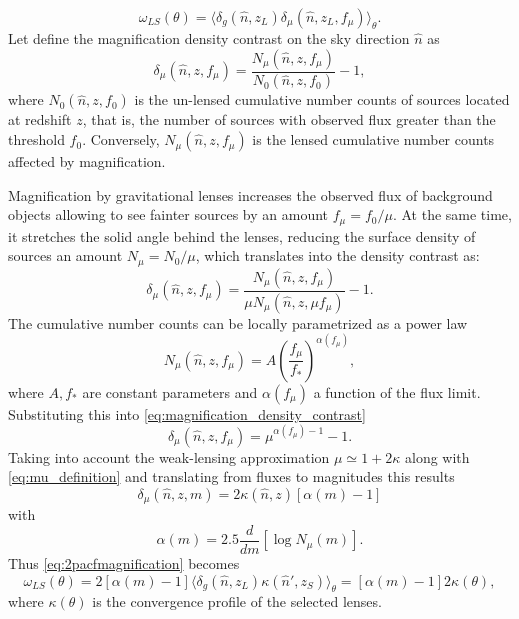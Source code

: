 \begin{equation}
\omega_{LS}(\theta) = \langle\delta_g(\hat n,z_L)\delta_\mu(\hat n,z_L,f_\mu)\rangle_\theta.
\end{equation}
Let define the magnification density contrast on the sky direction $\hat n$ as 
\begin{equation}
\delta_\mu(\hat n,z,f_\mu) = \frac{N_\mu(\hat n,z,f_\mu)}{N_0(\hat n,z,f_0)}-1,
\end{equation}
where $N_0(\hat n,z,f_0)$ is the un-lensed cumulative number counts of sources located at redshift $z$, that is, the number of sources with observed flux greater than the threshold $f_0$. Conversely, $N_\mu(\hat n,z,f_\mu)$ is the lensed cumulative number counts affected by magnification.
\newline

Magnification by gravitational lenses increases the observed flux of background objects  allowing to see fainter sources by an amount $f_\mu = f_0/\mu$. At the same time, it stretches the solid angle behind the lenses, reducing the surface density of sources an amount $N_\mu = N_0/\mu$, which translates into the density contrast as:
\begin{equation}
\delta_\mu(\hat n,z,f_\mu) = \frac{N_\mu(\hat n,z,f_\mu)}{\mu N_\mu(\hat n,z,\mu f_\mu)}-1.
\label{eq:magnification_density_contrast}
\end{equation}
The cumulative number counts can be locally parametrized as a power law
\begin{equation}
N_\mu(\hat n,z,f_\mu) = A\left(\frac{f_\mu}{f_*}\right)^{\alpha(f_\mu)},
\end{equation}
where $A,f_*$ are constant parameters and $\alpha(f_\mu)$ a function of the flux limit. Substituting this into \autoref{eq:magnification_density_contrast}
\begin{equation}
\delta_\mu(\hat n,z,f_\mu) = \mu^{\alpha(f_\mu)-1}-1.
\end{equation}
Taking into account the weak-lensing approximation $\mu\simeq 1+2\kappa$ along with \autoref{eq:mu_definition} and translating from fluxes to magnitudes this results
\begin{equation}
\delta_\mu(\hat n,z,m) = 2\kappa(\hat n,z)[\alpha(m)-1]
\end{equation}
with
\begin{equation}
\alpha(m) = 2.5\frac{d}{dm}\left[\log N_\mu(m)\right].
\label{eq:alpha}
\end{equation}
Thus \autoref{eq:2pacfmagnification} becomes
\begin{equation}
\omega_{LS}(\theta) = 2[\alpha(m)-1]\langle\delta_g(\hat n,z_L)\kappa(\hat n',z_S)\rangle_\theta = [\alpha(m)-1]2\kappa(\theta),
\label{eq:kappa_nc}
\end{equation}
where $\kappa(\theta)$ is the convergence profile of the selected lenses.

